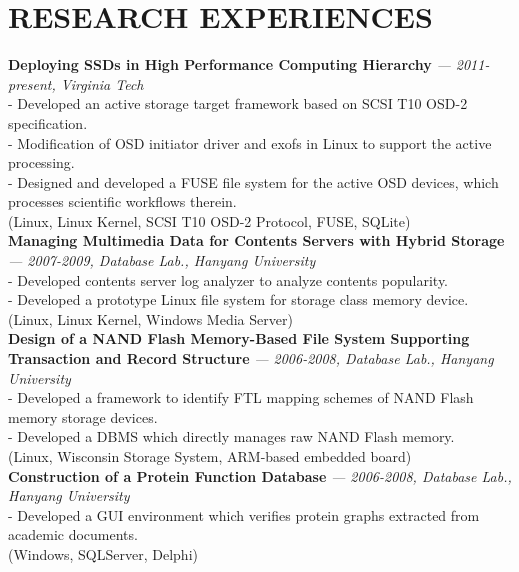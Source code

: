 \section{RESEARCH EXPERIENCES} 
\vspace{0.07in}
  {\bf Deploying SSDs in High Performance Computing Hierarchy}
    {\it \footnotesize --- 2011-present, Virginia Tech} \\
    - Developed an active storage target framework based on SCSI T10 OSD-2
    specification.\\
    - Modification of OSD initiator driver and exofs in Linux to support the
    active processing.\\
    - Designed and developed a FUSE file system for the active OSD devices, which
    processes scientific workflows therein.\\
    {\footnotesize(Linux, Linux Kernel, SCSI T10 OSD-2 Protocol, FUSE, SQLite)}
    \vspace{0.03in}\\
  {\bf Managing Multimedia Data for Contents Servers with Hybrid Storage}
    {\it \footnotesize --- 2007-2009, Database Lab., Hanyang University}\\
    - Developed contents server log analyzer to analyze contents popularity.\\
    - Developed a prototype Linux file system for storage class memory device.\\
    {\footnotesize(Linux, Linux Kernel, Windows Media Server)}
    \vspace{0.03in}\\
  {\bf Design of a NAND Flash Memory-Based File System Supporting Transaction and
       Record Structure} 
     {\it \footnotesize --- 2006-2008, Database Lab., Hanyang University}\\
     - Developed a framework to identify FTL mapping schemes of NAND Flash memory
     storage devices.\\
     - Developed a DBMS which directly manages raw NAND Flash memory.\\
     {\footnotesize(Linux, Wisconsin Storage System, ARM-based embedded
      board)}
    \vspace{0.03in}\\
   {\bf Construction of a Protein Function Database} 
     {\it \footnotesize --- 2006-2008, Database Lab., Hanyang University}\\
     - Developed a GUI environment which verifies protein graphs extracted
     from academic documents.\\
     {\footnotesize(Windows, SQLServer, Delphi)}

